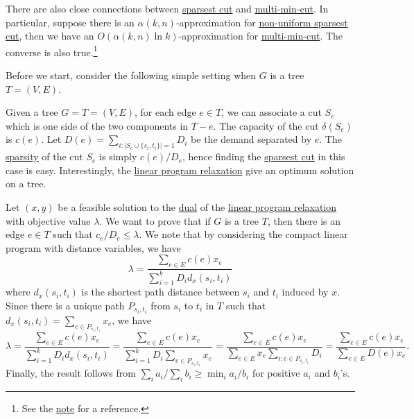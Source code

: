 \begin{remark}
	There are also close connections between \hyperref[prb:non-uniform-sparsest-cut]{sparsest cut} and \hyperref[prb:multi-min-cut]{multi-min-cut}. In particular, suppose there is an \(\alpha (k, n)\)-approximation for \hyperref[prb:non-uniform-sparsest-cut]{non-uniform sparsest cut}, then we have an \(O(\alpha (k, n) \ln k)\)-approximation for \hyperref[prb:multi-min-cut]{multi-min-cut}. The converse is also true.\footnote{See the \href{https://courses.grainger.illinois.edu/cs598csc/fa2024/Notes/lec-sparsest-cut.pdf}{note} for a reference.}
\end{remark}

Before we start, consider the following simple setting when \(G\) is a tree \(T = (V, E)\).

\begin{eg}[Tree]
	Given a tree \(G = T = (V, E)\), for each edge \(e \in T\), we can associate a cut \(S_e\) which is one side of the two components in \(T - e\). The capacity of the cut \(\delta (S_e)\) is \(c(e)\). Let \(D(e) = \sum_{i\colon \lvert S_e \cup \{ s_i, t_i \} \rvert = 1} D_i \) be the demand separated by \(e\). The \hyperref[def:sparsity]{sparsity} of the cut \(S_e\) is simply \(c(e) / D_e\), hence finding the \hyperref[prb:sparsest-cut]{sparsest cut} in this case is easy. Interestingly, the \hyperref[eq:non-uniform-sparsest-cut-LP-primal]{linear program relaxation} give an optimum solution on a tree.
\end{eg}
\begin{explanation}
	Let \((x, y)\) be a feasible solution to the \hyperref[eq:non-uniform-sparsest-cut-LP-dual]{dual} of the \hyperref[eq:non-uniform-sparsest-cut-LP-primal]{linear program relaxation} with objective value \(\lambda \). We want to prove that if \(G\) is a tree \(T\), then there is an edge \(e \in T\) such that \(c_e / D_e \leq \lambda \). We note that by considering the compact linear program with distance variables, we have
	\[
		\lambda
		= \frac{\sum_{e \in E} c(e) x_e}{\sum_{i=1}^{k} D_i d_x(s_i, t_i)}
	\]
	where \(d_x(s_i, t_i)\) is the shortest path distance between \(s_i\) and \(t_i\) induced by \(x\). Since there is a unique path \(P_{s_i, t_i}\) from \(s_i\) to \(t_i\) in \(T\) such that \(d_x(s_i, t_i) = \sum_{e \in P_{s_i, t_i}} x_e\), we have
	\[
		\lambda
		= \frac{\sum_{e \in E} c(e) x_e}{\sum_{i=1}^{k} D_i d_x(s_i, t_i)}
		= \frac{\sum_{e \in E} c(e) x_e}{\sum_{i=1}^{k} D_i \sum_{e \in P_{s_i, t_i}} x_e}
		= \frac{\sum_{e \in E} c(e) x_e}{\sum_{e \in E} x_e \sum_{i \colon e \in P_{s_i, t_i}} D_i}
		= \frac{\sum_{e \in E} c(e) x_e}{\sum_{e \in E} D(e) x_e }.
	\]
	Finally, the result follows from \(\sum_{i} a_i / \sum_{i} b_i \geq \min _i a_i / b_i\) for positive \(a_i\) and \(b_i\)'s.
\end{explanation}

